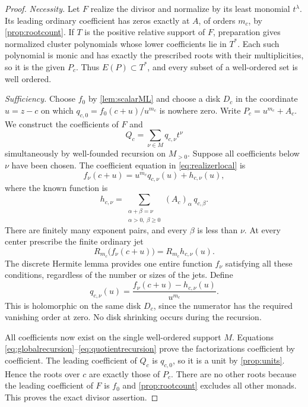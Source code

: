 \documentclass[11pt,letterpaper]{article}
\theoremstyle{definition}
\theoremstyle{remark}
\numberwithin{equation}{section}
\begin{document}
\begin{proof}
\emph{Necessity.} Let $F$ realize the divisor and normalize by its least monomial $t^\lambda$. Its leading ordinary coefficient has zeros exactly at $A$, of orders $m_c$, by \cref{prop:rootcount}. If $T$ is the positive relative support of $F$, preparation gives normalized cluster polynomials whose lower coefficients lie in $T^*$. Each such polynomial is monic and has exactly the prescribed roots with their multiplicities, so it is the given $P_c$. Thus $E(P)\subset T^*$, and every subset of a well-ordered set is well ordered.

\emph{Sufficiency.} Choose $f_0$ by \cref{lem:scalarML} and choose a disk $D_c$ in the coordinate $u=z-c$ on which $q_{c,0}=f_0(c+u)/u^{m_c}$ is nowhere zero. Write $P_c=u^{m_c}+A_c$. We construct the coefficients of $F$ and
\[
 Q_c=\sum_{\nu\in M}q_{c,\nu}t^\nu
\]
simultaneously by well-founded recursion on $M_{>0}$. Suppose all coefficients below $\nu$ have been chosen. The coefficient equation in \eqref{eq:realizerlocal} is
\begin{equation}\label{eq:globalrecursion}
 f_\nu(c+u)=u^{m_c}q_{c,\nu}(u)+h_{c,\nu}(u),
\end{equation}
where the known function is
\begin{equation}\label{eq:knowncorrection}
 h_{c,\nu}=
 \sum_{\substack{\alpha+\beta=\nu\\\alpha>0,\ \beta\ge0}}
 (A_c)_\alpha\,q_{c,\beta}.
\end{equation}
There are finitely many exponent pairs, and every $\beta$ is less than $\nu$. At every center prescribe the finite ordinary jet
\[
 R_{m_c}\bigl(f_\nu(c+u)\bigr)=R_{m_c}h_{c,\nu}(u).
\]
The discrete Hermite lemma provides one entire function $f_\nu$ satisfying all these conditions, regardless of the number or sizes of the jets. Define
\begin{equation}\label{eq:quotientrecursion}
 q_{c,\nu}(u)=
 \frac{f_\nu(c+u)-h_{c,\nu}(u)}{u^{m_c}}.
\end{equation}
This is holomorphic on the same disk $D_c$, since the numerator has the required vanishing order at zero. No disk shrinking occurs during the recursion.

All coefficients now exist on the single well-ordered support $M$. Equations \eqref{eq:globalrecursion}--\eqref{eq:quotientrecursion} prove the factorizations coefficient by coefficient. The leading coefficient of $Q_c$ is $q_{c,0}$, so it is a unit by \cref{prop:units}. Hence the roots over $c$ are exactly those of $P_c$. There are no other roots because the leading coefficient of $F$ is $f_0$ and \cref{prop:rootcount} excludes all other monads. This proves the exact divisor assertion.
\end{proof}
\end{document}
